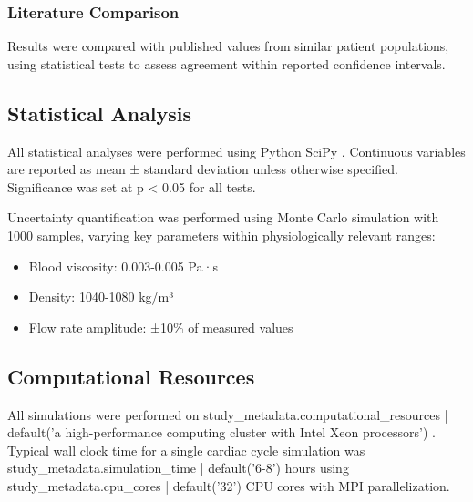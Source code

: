 \subsubsection{Literature Comparison}
Results were compared with published values from similar patient populations, using statistical tests to assess agreement within reported confidence intervals.

\subsection{Statistical Analysis}
All statistical analyses were performed using Python SciPy \cite{ref_scipy}. Continuous variables are reported as mean ± standard deviation unless otherwise specified. Significance was set at p < 0.05 for all tests.

Uncertainty quantification was performed using Monte Carlo simulation with 1000 samples, varying key parameters within physiologically relevant ranges:
\begin{itemize}
    \item Blood viscosity: 0.003-0.005 Pa·s
    \item Density: 1040-1080 kg/m³
    \item Flow rate amplitude: ±10\% of measured values
\end{itemize}

\subsection{Computational Resources}
All simulations were performed on {{ study_metadata.computational_resources | default('a high-performance computing cluster with Intel Xeon processors') }}. Typical wall clock time for a single cardiac cycle simulation was {{ study_metadata.simulation_time | default('6-8') }} hours using {{ study_metadata.cpu_cores | default('32') }} CPU cores with MPI parallelization.